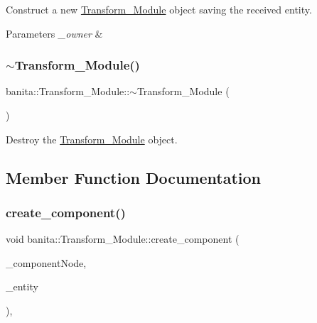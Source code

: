 Construct a new \mbox{\hyperlink{classbanita_1_1_transform___module}{Transform\+\_\+\+Module}} object saving the received entity. 


\begin{DoxyParams}{Parameters}
{\em \+\_\+owner} & \\
\hline
\end{DoxyParams}
\mbox{\label{classbanita_1_1_transform___module_a22ef547c4e2766126a571aeaf4679fc0}} 
\subsubsection{\texorpdfstring{$\sim$Transform\_Module()}{~Transform\_Module()}}
{\footnotesize\ttfamily banita\+::\+Transform\+\_\+\+Module\+::$\sim$\+Transform\+\_\+\+Module (\begin{DoxyParamCaption}{ }\end{DoxyParamCaption})\hspace{0.3cm}{\ttfamily [inline]}}



Destroy the \mbox{\hyperlink{classbanita_1_1_transform___module}{Transform\+\_\+\+Module}} object. 



\subsection{Member Function Documentation}
\mbox{\label{classbanita_1_1_transform___module_a2a1181f23617bb6dfe71e1f7e16945e9}} 
\subsubsection{\texorpdfstring{create\_component()}{create\_component()}}
{\footnotesize\ttfamily void banita\+::\+Transform\+\_\+\+Module\+::create\+\_\+component (\begin{DoxyParamCaption}\item[{X\+M\+L\+\_\+\+Node $\ast$}]{\+\_\+component\+Node,  }\item[{\mbox{\hyperlink{classbanita_1_1_entity}{Entity}} $\ast$}]{\+\_\+entity }\end{DoxyParamCaption})\hspace{0.3cm}{\ttfamily [override]}, {\ttfamily [virtual]}}



